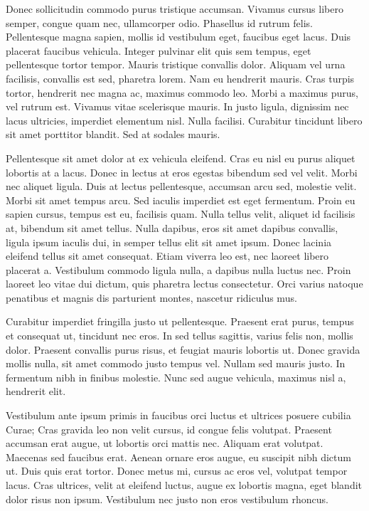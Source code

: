 Donec sollicitudin commodo purus tristique accumsan. Vivamus cursus libero semper, congue quam nec, ullamcorper odio. Phasellus id rutrum felis. Pellentesque magna sapien, mollis id vestibulum eget, faucibus eget lacus. Duis placerat faucibus vehicula. Integer pulvinar elit quis sem tempus, eget pellentesque tortor tempor. Mauris tristique convallis dolor. Aliquam vel urna facilisis, convallis est sed, pharetra lorem. Nam eu hendrerit mauris. Cras turpis tortor, hendrerit nec magna ac, maximus commodo leo. Morbi a maximus purus, vel rutrum est. Vivamus vitae scelerisque mauris. In justo ligula, dignissim nec lacus ultricies, imperdiet elementum nisl. Nulla facilisi. Curabitur tincidunt libero sit amet porttitor blandit. Sed at sodales mauris.

Pellentesque sit amet dolor at ex vehicula eleifend. Cras eu nisl eu purus aliquet lobortis at a lacus. Donec in lectus at eros egestas bibendum sed vel velit. Morbi nec aliquet ligula. Duis at lectus pellentesque, accumsan arcu sed, molestie velit. Morbi sit amet tempus arcu. Sed iaculis imperdiet est eget fermentum. Proin eu sapien cursus, tempus est eu, facilisis quam. Nulla tellus velit, aliquet id facilisis at, bibendum sit amet tellus. Nulla dapibus, eros sit amet dapibus convallis, ligula ipsum iaculis dui, in semper tellus elit sit amet ipsum. Donec lacinia eleifend tellus sit amet consequat. Etiam viverra leo est, nec laoreet libero placerat a. Vestibulum commodo ligula nulla, a dapibus nulla luctus nec. Proin laoreet leo vitae dui dictum, quis pharetra lectus consectetur. Orci varius natoque penatibus et magnis dis parturient montes, nascetur ridiculus mus.

Curabitur imperdiet fringilla justo ut pellentesque. Praesent erat purus, tempus et consequat ut, tincidunt nec eros. In sed tellus sagittis, varius felis non, mollis dolor. Praesent convallis purus risus, et feugiat mauris lobortis ut. Donec gravida mollis nulla, sit amet commodo justo tempus vel. Nullam sed mauris justo. In fermentum nibh in finibus molestie. Nunc sed augue vehicula, maximus nisl a, hendrerit elit.

Vestibulum ante ipsum primis in faucibus orci luctus et ultrices posuere cubilia Curae; Cras gravida leo non velit cursus, id congue felis volutpat. Praesent accumsan erat augue, ut lobortis orci mattis nec. Aliquam erat volutpat. Maecenas sed faucibus erat. Aenean ornare eros augue, eu suscipit nibh dictum ut. Duis quis erat tortor. Donec metus mi, cursus ac eros vel, volutpat tempor lacus. Cras ultrices, velit at eleifend luctus, augue ex lobortis magna, eget blandit dolor risus non ipsum. Vestibulum nec justo non eros vestibulum rhoncus.

